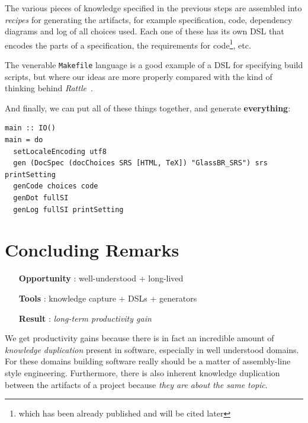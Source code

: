 \documentclass[sigconf,review,anonymous=false]{acmart}
\newcommand{\heading}[1]{\noindent{\large {\textbf{#1}\ }}}
\begin{document}
\heading{Step 6: Recipe to generate artifacts}

The various pieces of knowledge specified in the previous steps are
assembled into \emph{recipes} for generating the artifacts, for example
specification, code, dependency diagrams and log of all choices used.  Each one
of these has its own DSL that encodes the parts of a specification, the
requirements for code\footnote{which has been already published
and will be cited later}, etc.

The venerable \texttt{Makefile} language is a good example of a DSL for
specifying build scripts, but where our ideas are more properly compared
with the kind of thinking behind \textit{Rattle}~\cite{mitchell:rattle_18_nov_2020}.

And finally, we can put all of these things together, and generate
\textbf{everything}:
\begin{lstlisting}
main :: IO()
main = do
  setLocaleEncoding utf8
  gen (DocSpec (docChoices SRS [HTML, TeX]) "GlassBR_SRS") srs printSetting
  genCode choices code
  genDot fullSI
  genLog fullSI printSetting
\end{lstlisting}

\section{Concluding Remarks} \label{ch:concluding_remarks}


\begin{mdframed}[style=MyFrame]
\begin{itemize}[leftmargin=]
\item[\textbf{Opportunity}]: well-understood + long-lived
\item[\textbf{Tools}]: knowledge capture + DSLs + generators
\item[\textbf{Result}]: \emph{long-term productivity gain}
\end{itemize}
\end{mdframed}

We get productivity gains because there is in fact an
incredible amount of \emph{knowledge duplication} present in software,
especially in well understood domains. For these domains building software really
should be a matter of assembly-line style engineering. Furthermore,
there is also inherent knowledge duplication between the artifacts of
a project because \emph{they are about the same topic}.
\end{document}
